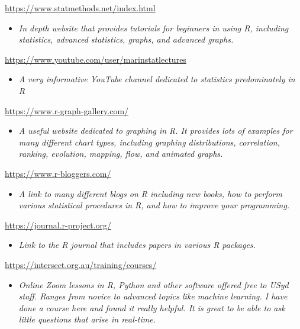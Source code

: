 \documentclass[
]{book}
\providecommand{\tightlist}{%
  \setlength{\itemsep}{0pt}\setlength{\parskip}{0pt}}
\begin{document}
\url{https://www.statmethods.net/index.html}

\begin{itemize}
\tightlist
\item
  \emph{In depth website that provides tutorials for beginners in using R, including statistics, advanced statistics, graphs, and advanced graphs. }
\end{itemize}

\url{https://www.youtube.com/user/marinstatlectures}

\begin{itemize}
\tightlist
\item
  \emph{A very informative YouTube channel dedicated to statistics predominately in R }
\end{itemize}

\url{https://www.r-graph-gallery.com/}

\begin{itemize}
\tightlist
\item
  \emph{A useful website dedicated to graphing in R. It provides lots of examples for many different chart types, including graphing distributions, correlation, ranking, evolution, mapping, flow, and animated graphs.}
\end{itemize}

\url{https://www.r-bloggers.com/}

\begin{itemize}
\tightlist
\item
  \emph{A link to many different blogs on R including new books, how to perform various statistical procedures in R, and how to improve your programming.}
\end{itemize}

\url{https://journal.r-project.org/}

\begin{itemize}
\tightlist
\item
  \emph{Link to the R journal that includes papers in various R packages.}
\end{itemize}

\url{https://intersect.org.au/training/courses/}

\begin{itemize}
\tightlist
\item
  \emph{Online Zoom lessons in R, Python and other software offered free to USyd staff. Ranges from novice to advanced topics like machine learning. I have done a course here and found it really helpful. It is great to be able to ask little questions that arise in real-time.}
\end{itemize}
\end{document}
